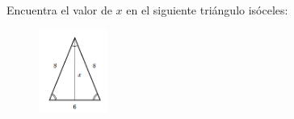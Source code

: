 Encuentra el valor de $x$ en el siguiente triángulo isóceles:
\begin{figure}[H]
    \begin{center}
        \includegraphics[width=0.2\textwidth]{../images/pitagoras0.png}
    \end{center}
    \caption{}
    \label{fig:pitagoras0}
\end{figure}